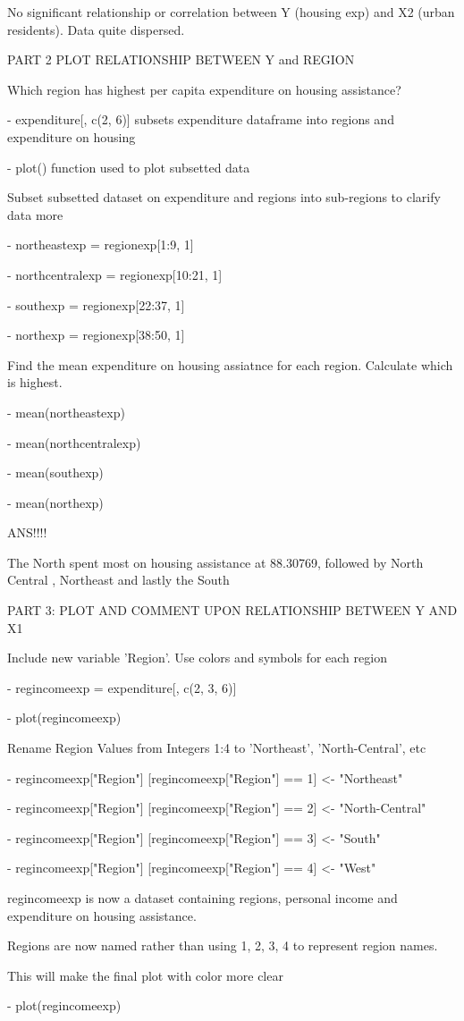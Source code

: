 \documentclass[12pt,letterpaper]{article}
\begin{document}
\begin{itemize}
No significant relationship or correlation between Y (housing exp) and X2 (urban residents). Data quite dispersed. 

PART 2 PLOT RELATIONSHIP BETWEEN  Y and REGION 

Which region has highest per capita expenditure on housing assistance?

- expenditure[, c(2, 6)] subsets expenditure dataframe into regions and expenditure on housing

- plot() function used to plot subsetted data

Subset subsetted dataset on expenditure and regions into sub-regions to clarify data more

- northeastexp = regionexp[1:9, 1]

- northcentralexp = regionexp[10:21, 1]

- southexp = regionexp[22:37, 1]

- northexp = regionexp[38:50, 1]

Find the mean expenditure on housing assiatnce for each region. Calculate which is highest.

- mean(northeastexp)

- mean(northcentralexp)

- mean(southexp)

- mean(northexp)

ANS!!!!

The North spent most on housing assistance at 88.30769, followed by North Central , Northeast  and lastly the South 

PART 3: PLOT AND COMMENT UPON RELATIONSHIP BETWEEN Y AND X1

Include new variable 'Region'. Use colors and symbols for each region

- regincomeexp =  expenditure[, c(2, 3, 6)]

- plot(regincomeexp)

Rename Region Values from Integers 1:4 to 'Northeast', 'North-Central', etc

- regincomeexp["Region"] [regincomeexp["Region"] == 1] <- "Northeast"

- regincomeexp["Region"] [regincomeexp["Region"] == 2] <- "North-Central"

- regincomeexp["Region"] [regincomeexp["Region"] == 3] <- "South"

- regincomeexp["Region"] [regincomeexp["Region"] == 4] <- "West"


regincomeexp is now a dataset containing regions, personal income and expenditure on housing assistance. 

Regions are now named rather than using 1, 2, 3, 4 to represent region names.

This will make the final plot with color more clear

- plot(regincomeexp)
 
\end{itemize}
\end{document}
